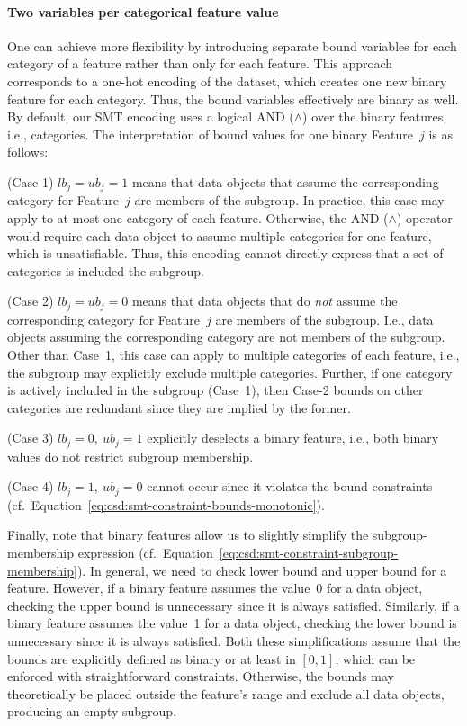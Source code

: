 \documentclass{article}
\theoremstyle{definition}
\begin{document}
\paragraph{Two variables per categorical feature value}

One can achieve more flexibility by introducing separate bound variables for each category of a feature rather than only for each feature.
This approach corresponds to a one-hot encoding of the dataset, which creates one new binary feature for each category.
Thus, the bound variables effectively are binary as well.
By default, our SMT encoding uses a logical AND ($\land$) over the binary features, i.e., categories.
The interpretation of bound values for one binary Feature~$j$ is as follows:

(Case 1) $\mathit{lb}_j = \mathit{ub}_j = 1$ means that data objects that assume the corresponding category for Feature~$j$ are members of the subgroup.
In practice, this case may apply to at most one category of each feature.
Otherwise, the AND ($\land$) operator would require each data object to assume multiple categories for one feature, which is unsatisfiable.
Thus, this encoding cannot directly express that a set of categories is included the subgroup.

(Case 2) $\mathit{lb}_j = \mathit{ub}_j = 0$ means that data objects that do \emph{not} assume the corresponding category for Feature~$j$ are members of the subgroup.
I.e., data objects assuming the corresponding category are not members of the subgroup.
Other than Case~1, this case can apply to multiple categories of each feature, i.e., the subgroup may explicitly exclude multiple categories.
Further, if one category is actively included in the subgroup (Case~1), then Case-2 bounds on other categories are redundant since they are implied by the former.

(Case 3) $\mathit{lb}_j = 0,~\mathit{ub}_j = 1$ explicitly deselects a binary feature, i.e., both binary values do not restrict subgroup membership.

(Case 4) $\mathit{lb}_j = 1,~\mathit{ub}_j = 0$ cannot occur since it violates the bound constraints (cf.~Equation~\ref{eq:csd:smt-constraint-bounds-monotonic}).

Finally, note that binary features allow us to slightly simplify the subgroup-membership expression (cf.~Equation~\ref{eq:csd:smt-constraint-subgroup-membership}).
In general, we need to check lower bound and upper bound for a feature.
However, if a binary feature assumes the value~0 for a data object, checking the upper bound is unnecessary since it is always satisfied.
Similarly, if a binary feature assumes the value~1 for a data object, checking the lower bound is unnecessary since it is always satisfied.
Both these simplifications assume that the bounds are explicitly defined as binary or at least in $[0, 1]$, which can be enforced with straightforward constraints.
Otherwise, the bounds may theoretically be placed outside the feature's range and exclude all data objects, producing an empty subgroup.
\end{document}
